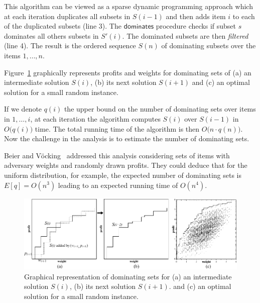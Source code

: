 \documentclass{article}
\begin{document}
This algorithm can be viewed as a sparse dynamic programming approach which
at each iteration duplicates all subsets in $S(i-1)$ and then adds item $i$
to each of the duplicated subsets (line 3).
The $\mathsf{dominates}$ procedure checks if subset $s$ dominates all others subsets in $S'(i)$.
The dominated subsets are then {\it filtered} (line 4).
The result is the ordered sequence $S(n)$ of dominating subsets over the items $1, \ldots, n$.

Figure~\ref{fig:pareto} graphically represents profits and weights for
dominating sets of (a) an intermediate solution $S(i)$,
(b) its next solution $S(i+1)$ and (c) an optimal solution for a small random instance.

If we denote $q(i)$ the upper bound on the number of dominating sets over items in
$1, \ldots, i$, at each iteration the algorithm computes $S(i)$ over $S(i-1)$ in $O\big(q(i)\big)$ time.
The total running time of the algorithm is then $O\big(n \cdot q(n)\big)$.
Now the challenge in the analysis is to estimate the number of dominating sets.

Beier and V{\"o}cking~\cite{beier2003random} addressed this analysis considering
sets of items with adversary weights and randomly drawn profits.
They could deduce that for the uniform distribution, for example, the expected
number of dominating sets is $E[q] = O(n^3)$ leading to an expected running
time of $O(n^4)$.

\begin{figure}
  \includegraphics[width=\textwidth]{pareto}
  \caption{Graphical representation of dominating sets for
  (a) an intermediate solution $S(i)$, (b) its next solution $S(i+1)$. and
  (c) an optimal solution for a small random instance.}
  \label{fig:pareto}
\end{figure}



\end{document}

